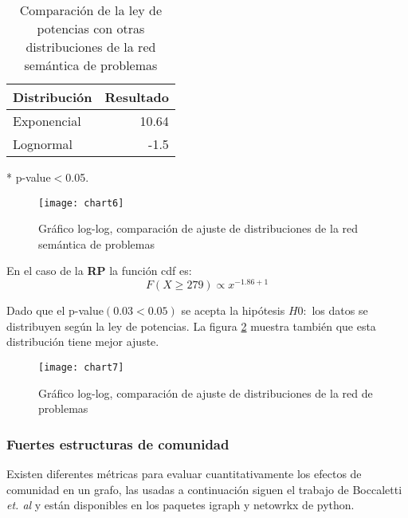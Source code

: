 \begin{table}[htb]
\centering
\caption{Comparación de la ley de potencias con otras distribuciones de la red semántica de problemas}
\label{distribucion}
\begin{threeparttable}
\begin{tabular}{@{}lr@{}}
\toprule
Distribución & Resultado    \\ \midrule
Exponencial  & 10.64\tnote{*}  \\
Lognormal    & -1.5 \\ \bottomrule
\end{tabular}
\begin{tablenotes}
    \item[*] p-value$<$\num{0.05}.
  \end{tablenotes}
\end{threeparttable}
\end{table}

\begin{figure}[ht]
\caption{Gráfico log-log, comparación de ajuste de distribuciones de la red semántica de problemas}
\label{fig:ajusteDistribuciones}
\centering
\texttt{[image: chart6]}
\end{figure}

En el caso de la \textbf{RP} la función cdf es:
\begin{equation}
F(X\geq 279) \propto x^{-1.86 +1}
\end{equation}

Dado que el p-value$(0.03<0.05)$ se acepta la hipótesis $H0:$ los datos se distribuyen según la ley de potencias. La figura \ref{fig:ajusteDistribucionesRP} muestra también que esta distribución tiene mejor ajuste.

\begin{figure}[ht]
\caption{Gráfico log-log, comparación de ajuste de distribuciones de la red de problemas}
\label{fig:ajusteDistribucionesRP}
\centering
\texttt{[image: chart7]}
\end{figure}


\subsubsection{Fuertes estructuras de comunidad}
Existen diferentes métricas para evaluar cuantitativamente los efectos de comunidad en un grafo, las usadas  a continuación siguen el trabajo de Boccaletti \textit{et. al}\cite{BOCCALETTI2006} y están disponibles en los paquetes igraph\cite{igraph} y netowrkx\cite{SciPyProceedings_11} de python.

